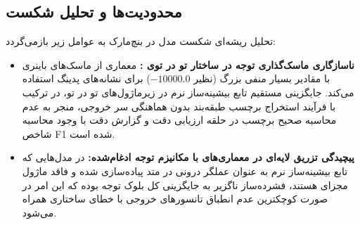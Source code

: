 \subsection{محدودیت‌ها و تحلیل شکست}
تحلیل ریشه‌ای شکست مدل در بنچ‌مارک  به عوامل زیر بازمی‌گردد:
\begin{itemize}
    \item \textbf{ناسازگاری ماسک‌گذاری توجه در ساختار تو در توی :} معماری  از ماسک‌های باینری با مقادیر بسیار منفی بزرگ (نظیر $-10000.0$) برای نشانه‌های پدینگ استفاده می‌کند. جایگزینی مستقیم تابع بیشینه‌ساز نرم در زیرماژول‌های تو در تو، در ترکیب با فرآیند استخراج برچسب طبقه‌بند بدون هماهنگی سر خروجی، منجر به عدم محاسبه صحیح برچسب در حلقه ارزیابی دقت و گزارش دقت  با وجود محاسبه شاخص F1 شده است.
    \item \textbf{پیچیدگی تزریق لایه‌ای در معماری‌های با مکانیزم توجه ادغام‌شده:} در مدل‌هایی که تابع بیشینه‌ساز نرم به عنوان عملگر درونی در متد  پیاده‌سازی شده و فاقد ماژول مجزای  هستند، فشرده‌ساز ناگزیر به جایگزینی کل بلوک توجه بوده که این امر در صورت کوچکترین عدم انطباق تانسورهای خروجی با خطای ساختاری همراه می‌شود.
\end{itemize}
